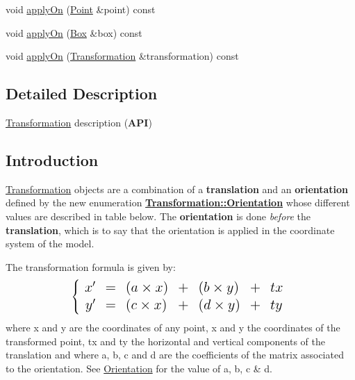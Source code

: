 \begin{DoxyCompactItemize}
\item 
void \hyperlink{classHurricane_1_1Transformation_ae73ca0f0e10d85267ef685d94eda9bcc}{apply\+On} (\hyperlink{classHurricane_1_1Point}{Point} \&point) const
\item 
void \hyperlink{classHurricane_1_1Transformation_aa3ab2731934330107a3f2a3079f21132}{apply\+On} (\hyperlink{classHurricane_1_1Box}{Box} \&box) const
\item 
void \hyperlink{classHurricane_1_1Transformation_a3ac2c40977ecf061b4316ecedc87918a}{apply\+On} (\hyperlink{classHurricane_1_1Transformation}{Transformation} \&transformation) const
\end{DoxyCompactItemize}


\subsection{Detailed Description}
\hyperlink{classHurricane_1_1Transformation}{Transformation} description ({\bfseries A\+PI}) 

\hypertarget{classHurricane_1_1Transformation_secTransformationIntro}{}\subsection{Introduction}\label{classHurricane_1_1Transformation_secTransformationIntro}
\hyperlink{classHurricane_1_1Transformation}{Transformation} objects are a combination of a {\bfseries translation} and an {\bfseries orientation} defined by the new enumeration {\bfseries \hyperlink{classHurricane_1_1Transformation_1_1Orientation}{Transformation\+::\+Orientation}} whose different values are described in table below. The {\bfseries orientation} is done {\itshape before} the {\bfseries translation}, which is to say that the orientation is applied in the coordinate system of the model.

The transformation formula is given by\+: \[ \Large \left \{ \begin{array}{r c l l l l l} x' & = & (a \times x) & + & (b \times y) & + & tx \\ y' & = & (c \times x) & + & (d \times y) & + & ty \end{array} \right . \] where x and y are the coordinates of any point, x\textquotesingle{} and y\textquotesingle{} the coordinates of the transformed point, tx and ty the horizontal and vertical components of the translation and where a, b, c and d are the coefficients of the matrix associated to the orientation. See \hyperlink{classHurricane_1_1Transformation_1_1Orientation}{Orientation} for the value of a, b, c \& d.

